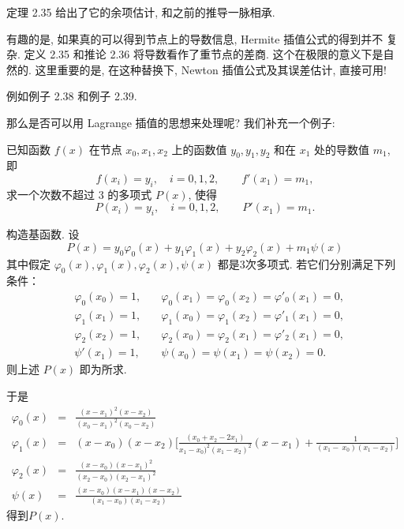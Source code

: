 \documentclass[a4paper]{ctexart}
\begin{document}
定理 2.35 给出了它的余项估计, 和之前的推导一脉相承.

有趣的是, 如果真的可以得到节点上的导数信息, Hermite 插值公式的得到并不
复杂. 定义 2.35 和推论 2.36 将导数看作了重节点的差商. 这个在极限的意义下是自然的. 
这里重要的是, 在这种替换下, Newton 插值公式及其误差估计, 直接可用!

例如例子 2.38 和例子 2.39.

那么是否可以用 Lagrange 插值的思想来处理呢? 我们补充一个例子:

已知函数 $f(x)$ 在节点 $x_0, x_1, x_2$ 上的函数值 $y_0, y_1, y_2$ 和在 $x_1$ 处的导数值
$m_1$, 即                                                                           
$$
f(x_i) = y_i,\quad i = 0, 1, 2, \qquad f'(x_1) = m_1,
$$                                 
求一个次数不超过 $3$ 的多项式 $P(x)$, 使得                                            
$$
P(x_i) = y_i,\quad i = 0, 1, 2, \qquad P'(x_1) = m_1.
$$  

构造基函数. 设                                                                   
$$
P(x) = y_0 \varphi_0(x) + y_1 \varphi_1(x) + y_2 \varphi_2(x) + m_1 \psi(x)
$$                                 
其中假定 $\varphi_0(x), \varphi_1(x), \varphi_2(x), \psi(x)$ 都是3次多项式.
若它们分别满足下列条件：     
\begin{eqnarray}                                                                                    
&\varphi_0(x_0)=1, \quad &\varphi_0(x_1)=\varphi_0(x_2)=\varphi'_0(x_1)=0,\\             
&\varphi_1(x_1)=1,\quad &\varphi_1(x_0)=\varphi_1(x_2)=\varphi'_1(x_1)=0,\\             
&\varphi_2(x_2)=1,\quad &\varphi_2(x_0)=\varphi_2(x_1)=\varphi'_2(x_1)=0,\\             
&\psi'(x_1)=1,\quad &\psi(x_0)=\psi(x_1)=\psi(x_2)=0.                                   
\end{eqnarray}                                                                                      
则上述 $P(x)$ 即为所求.

于是                                                                                     
\begin{eqnarray*}                                                                                            
\varphi_0(x)&=&\frac{(x-x_1)^2(x-x_2)}{(x_0-x_1)^2(x_0-x_2)}\\                                       
\varphi_1(x)&=&(x-x_0)(x-x_2)\Big[\frac{(x_0+x_2-2x_1)}{x_1-x_0)^2(x_1-x_2)^2}(x-x_1)+\frac{1}{(x_1-\
x_0)(x_1-x_2)}\Big]\\                                                                               
\varphi_2(x)&=&\frac{(x-x_0)(x-x_1)^2}{(x_2-x_0)(x_2-x_1)^2}\\                                       
\psi(x)&=&\frac{(x-x_0)(x-x_1)(x-x_2)}{(x_1-x_0)(x_1-x_2)}                                           
\end{eqnarray*}                                                                                                  
得到$P(x)$.
\end{document}
